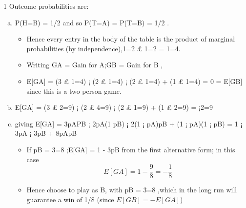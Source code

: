 \documentclass[a4paper,12pt]{article}
\begin{document}
1 Outcome probabilities are:
\begin{enumerate}[(a)]
    \item  P(H=B) = 1/2 and so P(T=A) = P(T=B) = 1/2 .
    \begin{itemize}
        \item Hence every entry in the body of the table is the product of marginal probabilities (by
independence),1=2 £ 1=2 = 1=4.
\item Writing GA = Gain for A;GB = Gain for B ,
\item E[GA] = (3 £ 1=4) ¡ (2 £ 1=4) ¡ (2 £ 1=4) + (1 £ 1=4) = 0 = E[GB]
since this is a two person game.
    \end{itemize}

\item E[GA] = (3 £ 2=9) ¡ (2 £ 4=9) ¡ (2 £ 1=9) + (1 £ 2=9) = ¡2=9
\item giving E[GA] = 3pAPB ¡ 2pA(1  pB) ¡ 2(1 ¡ pA)pB + (1 ¡ pA)(1 ¡ pB) = 1 ¡ 3pA ¡
3pB + 8pApB
\begin{itemize}
\item If pB = 3=8 ;E[GA] = 1 - 3pB from the first alternative form; in this case \[E[GA] =
1 - \frac{9}{8}  = - \frac{1}{8}\]
\item Hence choose to play as B, with pB = 3=8 ,which in the long run will guarantee a win of 1/8
(since $E[GB] = -E[GA]$)
\end{itemize}
\end{enumerate}
\end{document}
